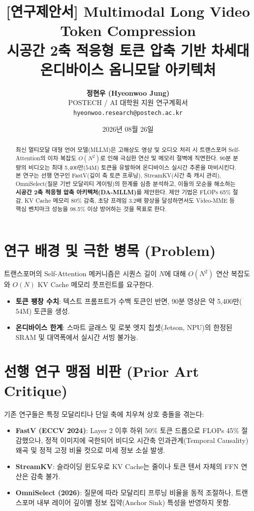 \documentclass[10pt, a4paper, twocolumn]{article}
\title{\LARGE \textbf{[연구제안서] Multimodal Long Video Token Compression}\\[0.3em]
\large 시공간 2축 적응형 토큰 압축 기반 차세대 온디바이스 옴니모달 아키텍처}
\author{\textbf{정현우 (Hyeonwoo Jung)}\\[0.2em]
POSTECH / AI 대학원 지원 연구계획서\\
\texttt{hyeonwoo.research@postech.ac.kr}}
\date{2026년 08월 26일}
\begin{document}
\maketitle

\begin{abstract}
최신 멀티모달 대형 언어 모델(MLLM)은 고해상도 영상 및 오디오 처리 시 트랜스포머 Self-Attention의 이차 복잡도 $O(N^2)$로 인해 극심한 연산 및 메모리 절벽에 직면한다. 90분 분량의 비디오는 최대 5,400만($54\text{M}$) 토큰을 유발하여 온디바이스 실시간 추론을 마비시킨다. 본 연구는 선행 연구인 FastV(깊이 축 토큰 프루닝), StreamKV(시간 축 캐시 관리), OmniSelect(질문 기반 모달리티 게이팅)의 한계를 심층 분석하고, 이들의 모순을 해소하는 \textbf{시공간 2축 적응형 압축 아키텍처(DA-MLLM)}를 제안한다. 제안 기법은 FLOPs 65\% 절감, KV Cache 메모리 80\% 감축, 초당 프레임 3.2배 향상을 달성하면서도 Video-MME 등 핵심 벤치마크 성능을 98.5\% 이상 방어하는 것을 목표로 한다.
\end{abstract}

\section{연구 배경 및 극한 병목 (Problem)}
트랜스포머의 Self-Attention 메커니즘은 시퀀스 길이 $N$에 대해 $O(N^2)$ 연산 복잡도와 $O(N)$ KV Cache 메모리 풋프린트를 요구한다.
\begin{itemize}
    \item \textbf{토큰 팽창 수치}: 텍스트 프롬프트가 수백 토큰인 반면, 90분 영상은 약 5,400만($54\text{M}$) 토큰을 생성.
    \item \textbf{온디바이스 한계}: 스마트 글래스 및 로봇 엣지 칩셋(Jetson, NPU)의 한정된 SRAM 및 대역폭에서 실시간 서빙 불가능.
\end{itemize}

\section{선행 연구 맹점 비판 (Prior Art Critique)}
기존 연구들은 특정 모달리티나 단일 축에 치우쳐 상호 충돌을 겪는다:
\begin{itemize}
    \item \textbf{FastV (ECCV 2024)}: Layer 2 이후 하위 50\% 토큰 드롭으로 FLOPs 45\% 절감했으나, 정적 이미지에 국한되어 비디오 시간축 인과관계(Temporal Causality) 왜곡 및 정적 고정 비율 컷으로 미세 정보 소실 발생.
    \item \textbf{StreamKV}: 슬라이딩 윈도우로 KV Cache는 줄이나 토큰 텐서 자체의 FFN 연산은 감축 불가.
    \item \textbf{OmniSelect (2026)}: 질문에 따라 모달리티 프루닝 비율을 동적 조절하나, 트랜스포머 내부 레이어 깊이별 정보 집약(Anchor Sink) 특성을 반영하지 못함.
\end{itemize}
\end{document}
